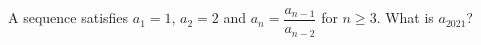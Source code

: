 A sequence satisfies $a_1=1$, $a_2=2$ and $a_n=\dfrac{a_{n-1}}{a_{n-2}}$ for $n\ge3$. What is $a_{2021}$?
